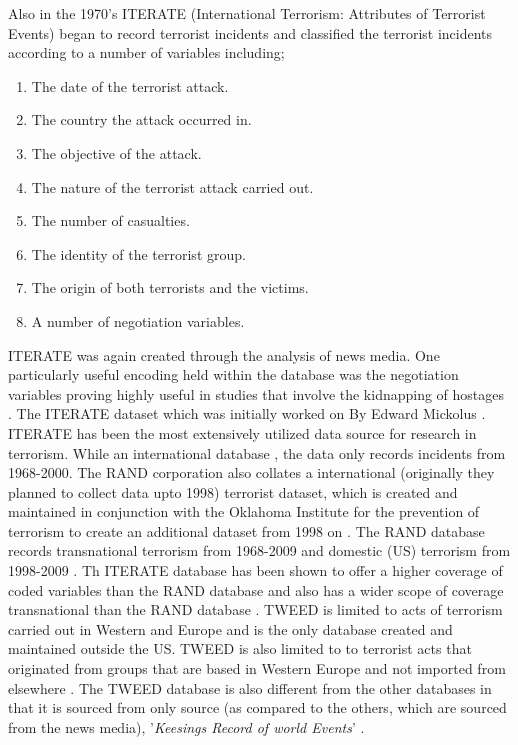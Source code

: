 Also in the 1970's ITERATE (International Terrorism: Attributes of Terrorist Events) began to record terrorist incidents and classified the terrorist incidents according to a number of variables including;  
\begin{enumerate}
\item The date of the terrorist attack.
\item The country the attack occurred in.
\item The objective of the attack.
\item The nature of the terrorist attack carried out.
\item The number of casualties.
\item The identity of the terrorist group.
\item The origin of both terrorists and the victims.
\item A number of negotiation variables.
\end{enumerate}
ITERATE was again created through the analysis of news media. One particularly useful encoding held within the database was the negotiation variables proving highly useful in studies that involve the kidnapping of hostages \citep{GPOL:GPOL142}. The ITERATE  dataset which was initially worked on By Edward Mickolus \citep{mickolus2013iterate}. ITERATE has been the most extensively utilized data source for research in terrorism. While an international database , the data only records incidents from  1968-2000. The RAND corporation also collates a international (originally they planned to collect data upto 1998) terrorist dataset, which is created and maintained in conjunction with the Oklahoma Institute for the prevention of terrorism to create an additional dataset from 1998 on \citep{lafree2007introducing}.  The RAND database records transnational terrorism from 1968-2009 and domestic (US) terrorism from 1998-2009 \citep{sandler2013analytical}. Th ITERATE database has been shown to offer a higher coverage of coded variables than the RAND database and also has a wider scope of coverage transnational than the RAND database \citep{enders2011political}. TWEED is limited to acts of terrorism carried out in Western and Europe and is the only database created and maintained outside the US. TWEED  is also limited to to terrorist acts that originated from groups that are based in Western Europe and not imported from elsewhere \citep{engene2007five}. The TWEED database is also different from the other databases in that it is sourced from only source (as compared to the others, which are sourced from the news media), '\textit{Keesings Record of world Events}' \citep{east2016keesing}.

